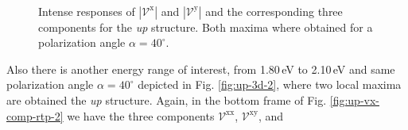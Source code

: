 \documentclass[prb,11pt,tightenlines,twocolumn,aps]{revtex4-1}
\begin{document}
\begin{figure}[t]
    \centering
    \\
    \caption{Intense responses of $|\mathcal{V}^{\mathrm{x}}|$ and
    $|\mathcal{V}^{\mathrm{y}}|$ and the corresponding three components for the
    \emph{up} structure. Both maxima where obtained for a polarization
    angle $\alpha=40^{\circ}$. }
    \label{fig:up-vab-comp-rtp-2}
\end{figure}
Also there is another energy range of interest, from 1.80\,eV to 2.10\,eV and
same polarization angle $\alpha=40^{\circ}$ depicted in Fig. \ref{fig:up-3d-2},
where two local maxima are obtained the \emph{up} structure. Again, in the
bottom frame of Fig. \ref{fig:up-vx-comp-rtp-2} we have the three components
$\mathcal{V}^{\mathrm{xx}}$, $\mathcal{V}^{\mathrm{xy}}$, and
\end{document}
